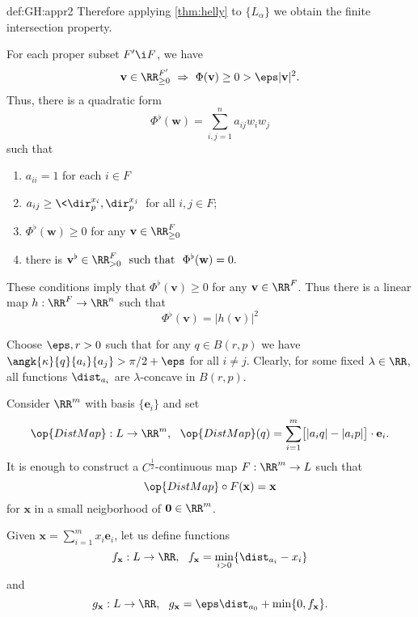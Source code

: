 {\begin{subthm}{def:GH:appr2}
Therefore applying \ref{thm:helly} to $\{L_\alpha\}$ we obtain 
the finite intersection property.























For each proper subset $F'\i F$, we have 
$$\mathbf v\in \RR_{\ge0}^{F'}\ \Rightarrow\ \Phi(\mathbf v)\ge0
>\eps|\mathbf v|^2.$$
Thus, there is a quadratic form 
$$\Phi^\flat(\mathbf w)=\sum_{i,j=1}^n a_{ij}w_iw_j$$ such that 
\begin{enumerate}
\item $a_{ii}=1$ for each $i\in F$
\item $a_{ij}\ge \<\dir_p^{x_i},\dir_p^{x_j}\>$ for all $i,j\in F$;
\item $\Phi^\flat(\mathbf w)\ge 0$ for any $\mathbf v\in\RR_{\ge0}^{F}$
\item there is $\mathbf v^\flat\in\RR_{>0}^{F}\ \ \text{such that}\ \ \Phi^\flat(\mathbf w)= 0.$
\end{enumerate}

These conditions imply that $\Phi^\flat(\mathbf v)\ge 0$ for any $\mathbf v\in\RR^{F}$.
Thus there is a linear map $h:\RR^F\to \RR^n$ such that
$$\Phi^\flat(\mathbf v)=|h(\mathbf v)|^2$$













 
Choose $\eps,r>0$ such that for any $q\in B(r,p)$ we have $\angk{\kappa}{q}{a_i}{a_j}>\pi/2+\eps$ for all $i\not=j$.
Clearly, for some fixed $\lambda\in\RR$, all functions $\dist_{a_i}$ are $\lambda$-concave in $B(r,p)$.

Consider $\RR^m$ with basis $\{\mathbf e_i\}$ and set
$$\op{DistMap}:L\to \RR^m,\ \ \op{DistMap}(q)=\sum_{i=1}^m\bigl[|a_iq|-|a_ip|\bigr]\cdot\mathbf e_i.$$
It is enough to construct a $C^{\frac12}$-continuous map $F:\RR^m\to L$ such that 
$$\op{DistMap}\circ F(\mathbf x)=\mathbf x$$ 
for $\mathbf x$ in a small neigborhood of $\mathbf 0\in \RR^m$.


Given $\mathbf x=\sum_{i=1}^mx_i\mathbf e_i$, 
let us define functions
$$f_{\mathbf x}:L\to\RR,\ \ f_{\mathbf x}=\min_{i>0}\{\dist_{a_i}- x_i\}$$
and 
$$g_{\mathbf x}:L\to\RR,\ \ g_{\mathbf x}=\eps\dist_{a_0}+\min\{0,f_{\mathbf x}\}.$$


\end{subthm}}
